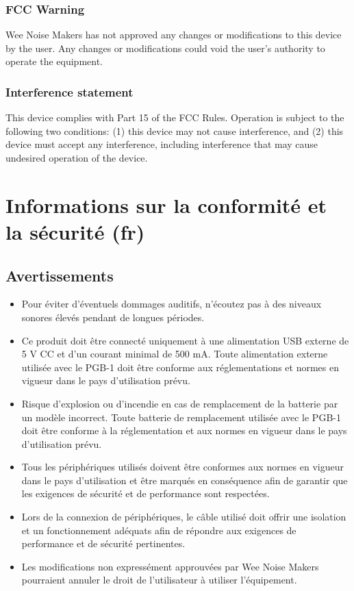 \documentclass[8pt]{extarticle}
\begin{document}
\begin{multicols*}{3}
\subsubsection{FCC Warning}

Wee Noise Makers has not approved any changes or modifications to this device by the user. Any
changes or modifications could void the user's authority to operate the equipment.

\subsubsection{Interference statement}

This device complies with Part 15 of the FCC Rules. Operation is subject to the following two conditions: (1) this device may not cause interference, and (2) this device must accept any interference, including interference that may cause undesired operation of the device.


\section{Informations sur la conformité et la sécurité  (fr)}

\subsection{Avertissements}
\begin{itemize}
\item Pour éviter d'éventuels dommages auditifs, n'écoutez pas à des niveaux sonores élevés pendant de longues périodes.
\item Ce produit doit être connecté uniquement à une alimentation USB externe de 5 V CC et d'un courant minimal de 500 mA. Toute alimentation externe utilisée avec le PGB-1 doit être conforme aux réglementations et normes en vigueur dans le pays d'utilisation prévu.
\item Risque d'explosion ou d'incendie en cas de remplacement de la batterie par un modèle incorrect. Toute batterie de remplacement utilisée avec le PGB-1 doit être conforme à la réglementation et aux normes en vigueur dans le pays d'utilisation prévu.
\item Tous les périphériques utilisés doivent être conformes aux normes en vigueur dans le pays d'utilisation et être marqués en conséquence afin de garantir que les exigences de sécurité et de performance sont respectées.
\item Lors de la connexion de périphériques, le câble utilisé doit offrir une isolation et un fonctionnement adéquats afin de répondre aux exigences de performance et de sécurité pertinentes.
\item Les modifications non expressément approuvées par Wee Noise Makers pourraient annuler le droit de l'utilisateur à utiliser l'équipement.
\end{itemize}


\end{multicols*}
\end{document}
